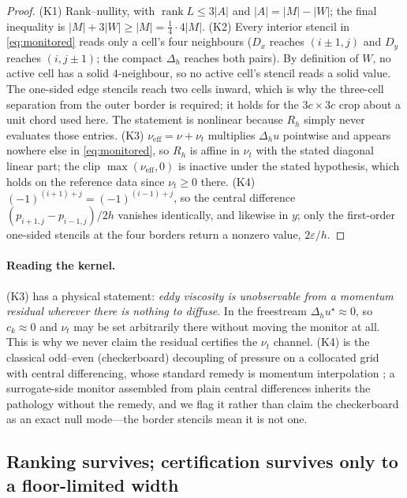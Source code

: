 \begin{proof}
(K1) Rank--nullity, with $\operatorname{rank}L\le3|A|$ and $|A|=|M|-|W|$; the final
inequality is $|M|+3|W|\ge|M|=\tfrac14\cdot4|M|$.
(K2) Every interior stencil in \eqref{eq:monitored} reads only a cell's four neighbours
($D_x$ reaches $(i\pm1,j)$ and $D_y$ reaches $(i,j\pm1)$; the compact $\Delta_h$ reaches both pairs).
By definition of $W$, no active cell has a solid $4$-neighbour, so no active cell's stencil
reads a solid value. The one-sided edge stencils reach two cells inward, which is why the
three-cell separation from the outer border is required; it holds for the $3c\times3c$ crop
about a unit chord used here. The statement is nonlinear because $R_h$ simply never
evaluates those entries.
(K3) $\nu_{\mathrm{eff}}=\nu+\nu_t$ multiplies $\Delta_hu$ pointwise and appears nowhere
else in \eqref{eq:monitored}, so $R_h$ is affine in $\nu_t$ with the stated diagonal linear
part; the clip $\max(\nu_{\mathrm{eff}},0)$ is inactive under the stated hypothesis, which
holds on the reference data since $\nu_t\ge0$ there.
(K4) $(-1)^{(i+1)+j}=(-1)^{(i-1)+j}$, so the central difference
$(p_{i+1,j}-p_{i-1,j})/2h$ vanishes identically, and likewise in $y$; only the first-order
one-sided stencils at the four borders return a nonzero value, $2\varepsilon/h$.
\end{proof}

\paragraph{Reading the kernel.} (K3) has a physical statement: \emph{eddy viscosity is
unobservable from a momentum residual wherever there is nothing to diffuse}. In the
freestream $\Delta_hu^\star\approx0$, so $c_k\approx0$ and $\nu_t$ may be set arbitrarily
there without moving the monitor at all. This is why we never claim the residual certifies
the $\nu_t$ channel. (K4) is the classical odd--even (checkerboard) decoupling of pressure
on a collocated grid with central differencing, whose standard remedy is momentum
interpolation \citep{rhiechow1983}; a surrogate-side monitor assembled from plain central
differences inherits the pathology without the remedy, and we flag it rather than claim the
checkerboard as an exact null mode---the border stencils mean it is not one.

\subsection{Ranking survives; certification survives only to a floor-limited width}

